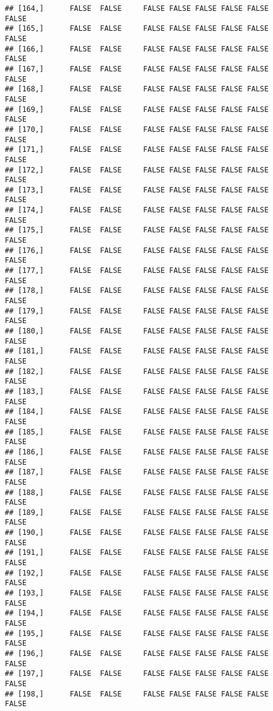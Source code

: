 \documentclass[
]{article}
\begin{document}
\begin{verbatim}
## [164,]      FALSE  FALSE     FALSE FALSE FALSE FALSE FALSE         FALSE
## [165,]      FALSE  FALSE     FALSE FALSE FALSE FALSE FALSE         FALSE
## [166,]      FALSE  FALSE     FALSE FALSE FALSE FALSE FALSE         FALSE
## [167,]      FALSE  FALSE     FALSE FALSE FALSE FALSE FALSE         FALSE
## [168,]      FALSE  FALSE     FALSE FALSE FALSE FALSE FALSE         FALSE
## [169,]      FALSE  FALSE     FALSE FALSE FALSE FALSE FALSE         FALSE
## [170,]      FALSE  FALSE     FALSE FALSE FALSE FALSE FALSE         FALSE
## [171,]      FALSE  FALSE     FALSE FALSE FALSE FALSE FALSE         FALSE
## [172,]      FALSE  FALSE     FALSE FALSE FALSE FALSE FALSE         FALSE
## [173,]      FALSE  FALSE     FALSE FALSE FALSE FALSE FALSE         FALSE
## [174,]      FALSE  FALSE     FALSE FALSE FALSE FALSE FALSE         FALSE
## [175,]      FALSE  FALSE     FALSE FALSE FALSE FALSE FALSE         FALSE
## [176,]      FALSE  FALSE     FALSE FALSE FALSE FALSE FALSE         FALSE
## [177,]      FALSE  FALSE     FALSE FALSE FALSE FALSE FALSE         FALSE
## [178,]      FALSE  FALSE     FALSE FALSE FALSE FALSE FALSE         FALSE
## [179,]      FALSE  FALSE     FALSE FALSE FALSE FALSE FALSE         FALSE
## [180,]      FALSE  FALSE     FALSE FALSE FALSE FALSE FALSE         FALSE
## [181,]      FALSE  FALSE     FALSE FALSE FALSE FALSE FALSE         FALSE
## [182,]      FALSE  FALSE     FALSE FALSE FALSE FALSE FALSE         FALSE
## [183,]      FALSE  FALSE     FALSE FALSE FALSE FALSE FALSE         FALSE
## [184,]      FALSE  FALSE     FALSE FALSE FALSE FALSE FALSE         FALSE
## [185,]      FALSE  FALSE     FALSE FALSE FALSE FALSE FALSE         FALSE
## [186,]      FALSE  FALSE     FALSE FALSE FALSE FALSE FALSE         FALSE
## [187,]      FALSE  FALSE     FALSE FALSE FALSE FALSE FALSE         FALSE
## [188,]      FALSE  FALSE     FALSE FALSE FALSE FALSE FALSE         FALSE
## [189,]      FALSE  FALSE     FALSE FALSE FALSE FALSE FALSE         FALSE
## [190,]      FALSE  FALSE     FALSE FALSE FALSE FALSE FALSE         FALSE
## [191,]      FALSE  FALSE     FALSE FALSE FALSE FALSE FALSE         FALSE
## [192,]      FALSE  FALSE     FALSE FALSE FALSE FALSE FALSE         FALSE
## [193,]      FALSE  FALSE     FALSE FALSE FALSE FALSE FALSE         FALSE
## [194,]      FALSE  FALSE     FALSE FALSE FALSE FALSE FALSE         FALSE
## [195,]      FALSE  FALSE     FALSE FALSE FALSE FALSE FALSE         FALSE
## [196,]      FALSE  FALSE     FALSE FALSE FALSE FALSE FALSE         FALSE
## [197,]      FALSE  FALSE     FALSE FALSE FALSE FALSE FALSE         FALSE
## [198,]      FALSE  FALSE     FALSE FALSE FALSE FALSE FALSE         FALSE

\end{verbatim}
\end{document}
